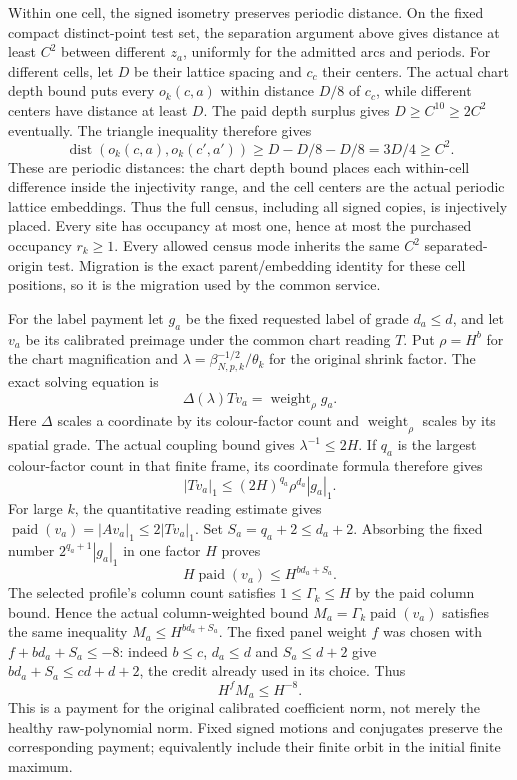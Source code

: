 Within one cell, the signed isometry preserves periodic distance.
On the fixed compact distinct-point test set, the separation argument
above gives distance at least $C^2$ between different $z_a$, uniformly
for the admitted arcs and periods. For different cells, let $D$ be
their lattice spacing and $c_c$ their centers. The actual chart depth
bound puts every $o_k(c,a)$ within distance $D/8$ of $c_c$, while
different centers have distance at least $D$. The paid depth surplus
gives $D\ge C^{10}\ge2C^2$ eventually. The triangle inequality
therefore gives
\[
 \operatorname{dist}(o_k(c,a),o_k(c',a'))
             \ge D-D/8-D/8=3D/4\ge C^2.
\]
These are periodic distances: the chart depth bound places each
within-cell difference inside the injectivity range, and the cell
centers are the actual periodic lattice embeddings. Thus the full
census, including all signed copies, is injectively placed. Every
site has occupancy at most one, hence at most the purchased
occupancy $r_k\ge1$. Every allowed census mode inherits the same
$C^2$ separated-origin test. Migration is the exact parent/embedding
identity for these cell positions, so it is the migration used by
the common service.

For the label payment let $g_a$ be the fixed requested label of grade
$d_a\le d$, and let $v_a$ be its calibrated preimage under the common
chart reading $T$. Put $\rho=H^b$ for the chart magnification and
$\lambda=\beta_{N,p,k}^{-1/2}/\theta_k$ for the original shrink
factor. The exact solving equation is
\[
 \Delta(\lambda)Tv_a=\operatorname{weight}_\rho g_a.
\]
Here $\Delta$ scales a coordinate by its colour-factor count and
$\operatorname{weight}_\rho$ scales by its spatial grade. The actual
coupling bound gives $\lambda^{-1}\le2H$. If $q_a$ is the largest
colour-factor count in that finite frame, its coordinate formula
therefore gives
\[
 |Tv_a|_1\le(2H)^{q_a}\rho^{d_a}|g_a|_1.
\]
For large $k$, the quantitative reading estimate gives
$\operatorname{paid}(v_a)=|Av_a|_1\le2|Tv_a|_1$.
Set $S_a=q_a+2\le d_a+2$. Absorbing the fixed number
$2^{q_a+1}|g_a|_1$ in one factor $H$ proves
\[
 H\operatorname{paid}(v_a)\le H^{bd_a+S_a}.
\]
The selected profile's column count satisfies $1\le\Gamma_k\le H$
by the paid column bound. Hence the actual column-weighted bound
$M_a=\Gamma_k\operatorname{paid}(v_a)$ satisfies the same inequality
$M_a\le H^{bd_a+S_a}$. The fixed panel weight $f$ was chosen with
$f+bd_a+S_a\le-8$: indeed $b\le c$, $d_a\le d$ and
$S_a\le d+2$ give $bd_a+S_a\le cd+d+2$, the credit already used
in its choice. Thus
\[
                    H^f M_a\le H^{-8}.
\]
This is a payment for the original calibrated coefficient norm,
not merely the healthy raw-polynomial norm. Fixed signed motions
and conjugates preserve the corresponding payment; equivalently
include their finite orbit in the initial finite maximum.

